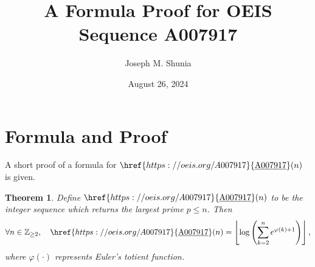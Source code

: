 \documentclass[10pt,a4paper]{article}
\title{A Formula Proof for OEIS Sequence A007917}
\author{Joseph M. Shunia}
\date{August 26, 2024}
\theoremstyle{plain}
\newtheorem{theorem}{Theorem}[section]
\newcommand{\floor}[1]{\left\lfloor #1 \right\rfloor}
\newcommand{\Z}{\mathbb{Z}}
\newcommand{\seqnum}[1]{\href{https://oeis.org/#1}{\rm \underline{#1}}}
\begin{document}
\maketitle

\section{Formula and Proof}
A short proof of a formula for $\seqnum{A007917}(n)$ is given.

\begin{theorem}
Define $\seqnum{A007917}(n)$ to be the integer sequence which returns the largest prime $p \leq n$. Then 
\begin{align*}
\forall n \in \Z_{\geq 2}, \quad 
\seqnum{A007917}(n) = \floor{ \log\left( \sum_{k=2}^n e^{\varphi(k)+1} \right) } ,
\end{align*}
where $\varphi(\cdot)$ represents Euler's totient function.
\end{theorem}
\end{document}
